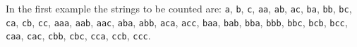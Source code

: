 In the first example the strings to be counted are: \texttt{a}, \texttt{b}, \texttt{c}, \texttt{aa}, \texttt{ab}, \texttt{ac}, \texttt{ba}, \texttt{bb}, \texttt{bc}, \texttt{ca}, \texttt{cb}, \texttt{cc}, \texttt{aaa}, \texttt{aab}, \texttt{aac}, \texttt{aba}, \texttt{abb}, \texttt{aca}, \texttt{acc}, \texttt{baa}, \texttt{bab}, \texttt{bba}, \texttt{bbb}, \texttt{bbc}, \texttt{bcb}, \texttt{bcc}, \texttt{caa}, \texttt{cac}, \texttt{cbb}, \texttt{cbc}, \texttt{cca}, \texttt{ccb}, \texttt{ccc}.